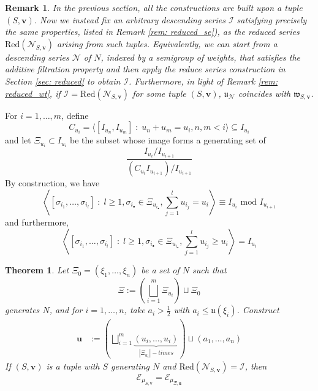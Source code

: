 \documentclass[pdflatex,sn-mathphys-num]{sn-jnl}%
\theoremstyle{thmstyleone}%
\newtheorem{theo}{Theorem}%
\theoremstyle{thmstyletwo}%
\newtheorem{rem}{Remark}%
\theoremstyle{thmstylethree}%
\begin{document}
\begin{rem}
In the previous section, all the constructions are built upon a tuple $(S,\mathbf{v})$. Now we instead fix an arbitrary descending series $\mathcal{I}$ satisfying precisely the same properties, listed in Remark \ref{rem: reduced_se}), as the reduced series $\mbox{Red}(\mathcal{N}_{S,\mathbf{v}})$
arising from such tuples. Equivalently, we can start from a descending series $\mathcal{N}$  of $N$, indexed by a semigroup of weights, that satisfies the 
additive filtration property and then apply the reduce series construction in Section \ref{sec: reduced} to obtain $\mathcal{I}$. Furthermore, in light of Remark \ref{rem: reduced_wt}, if $\mathcal{I} = \mbox{Red}(\mathcal{N}_{S,\mathbf{v}})$ for some tuple $(S,\mathbf{v})$,  $\mathfrak{u}_\mathcal{N}$ coincides with $\mathfrak{w}_{S,\mathbf{v}}$. 
\end{rem}

For $i=1,\ldots, m$, define 
$$C_{u_i} = \langle [I_{u_{n}},  I_{u_{m}}]\;:\;  u_{n} + u_{m} =  u_{i}, n,m <  i\rangle \subseteq I_{u_{i}}$$
and let $\Xi_{u_i} \subset I_{u_i}$ be the subset whose image forms a generating set of 
$$ \frac{I_{u_i}/I_{u_{i+1}}}{(C_{u_i} I_{u_{i+1}} )/I_{u_{i+1}}}$$
By construction, we have 
$$\left\langle [\sigma_{i_1}, \ldots, \sigma_{i_l}]\;:\; l \ge 1, \sigma_{i_\bullet} \in \Xi_{u_{i_\bullet}}, \sum_{j=1}^l u_{i_j} = u_i\right \rangle \equiv I_{u_i} \text{ mod }I_{u_{i+1}}$$
and furthermore, 
$$\left\langle [\sigma_{i_1}, \ldots, \sigma_{i_l}]\;:\; l \ge 1, \sigma_{i_\bullet} \in \Xi_{u_{i_\bullet}}, \sum_{j=1}^l u_{i_j} \ge  u_i\right \rangle =  I_{u_i} $$


\begin{theo}

\label{thm: Xi}
Let $\Xi_0 = (\xi_1,\ldots, \xi_n)$ be a set of $N$
such that 
$$\Xi := \left(\bigsqcup_{i=1}^{m} \Xi_{u_i}\right) \sqcup \Xi_0$$
generates $N$, and  for $i=1,\ldots, n$, take $a_i > \frac{1}{2}$ with $a_i \le \mathfrak{u}(\xi_i)$. Construct 
\begin{align*}
 \mathbf{u} &:= \left(\bigsqcup_{i=1}^{m} \underbrace{(u_i,\ldots, u_i)}_{|\Xi_{u_i}|-times}  \right) \sqcup (a_1,\ldots,a_n) 
\end{align*}
If $(S,\mathbf{v})$ 
is a tuple with $S$ generating $N$ and  $\mbox{Red}(\mathcal{N}_{S,\mathbf{v}}) = \mathcal{I}$, then 
$$\mathcal{E}_{\mu_{S,\mathbf{v}}} =  \mathcal{E}_{\mu_{\Xi, \mathbf{u}}}$$
\end{theo}
\end{document}
